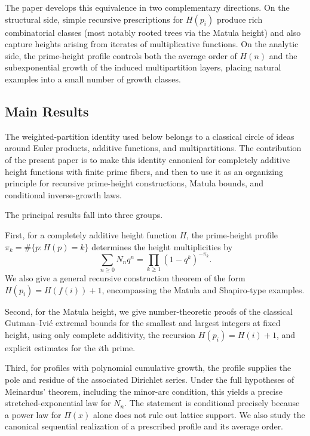 \documentclass[11pt]{article}
\theoremstyle{definition}
\begin{document}
The paper develops this equivalence in two complementary directions.  On the
structural side, simple recursive prescriptions for $H(p_i)$ produce rich
combinatorial classes (most notably rooted trees via the Matula height) and also
capture heights arising from iterates of multiplicative functions.  On the
analytic side, the prime-height profile controls both the average order of
$H(n)$ and the subexponential growth of the induced multipartition layers,
placing natural examples into a small number of growth classes.

\subsection{Main Results}

The weighted-partition identity used below belongs to a classical circle of
ideas around Euler products, additive functions, and multipartitions.  The
contribution of the present paper is to make this identity canonical for
completely additive height functions with finite prime fibers, and then to use it
as an organizing principle for recursive prime-height constructions, Matula
bounds, and conditional inverse-growth laws.

The principal results fall into three groups.

First, for a completely additive height function $H$, the prime-height profile
$\pi_k=\#\{p:H(p)=k\}$ determines the height multiplicities by
\[
  \sum_{n\ge0}N_nq^n=\prod_{k\ge1}(1-q^k)^{-\pi_k}.
\]
We also give a general recursive construction theorem of the form
$H(p_i)=H(f(i))+1$, encompassing the Matula and Shapiro-type examples.

Second, for the Matula height, we give number-theoretic proofs of the classical
Gutman--Ivi\'c extremal bounds for the smallest and largest integers at fixed
height, using only complete additivity, the recursion $H(p_i)=H(i)+1$, and
explicit estimates for the $i$th prime.

Third, for profiles with polynomial cumulative growth, the profile supplies the
pole and residue of the associated Dirichlet series.  Under the full hypotheses
of Meinardus' theorem, including the minor-arc condition, this yields a precise
stretched-exponential law for $N_n$.  The statement is conditional precisely
because a power law for $\Pi(x)$ alone does not rule out lattice support.  We
also study the canonical sequential realization of a prescribed profile and its
average order.
\end{document}
